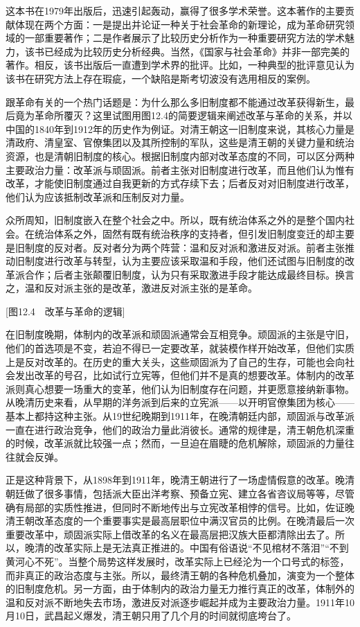 这本书在1979年出版后，迅速引起轰动，赢得了很多学术荣誉。这本著作的主要贡献体现在两个方面：一是提出并论证一种关于社会革命的新理论，成为革命研究领域的一部重要著作；二是作者展示了比较历史分析作为一种重要研究方法的学术魅力，该书已经成为比较历史分析经典。当然，《国家与社会革命》并非一部完美的著作。相反，该书出版后一直遭到学术界的批评。比如，一种典型的批评意见认为该书在研究方法上存在瑕疵，一个缺陷是斯考切波没有选用相反的案例。

跟革命有关的一个热门话题是：为什么那么多旧制度都不能通过改革获得新生，最后竟为革命所覆灭？这里试图用图12.4的简要逻辑来阐述改革与革命的关系，并以中国的1840年到1912年的历史作为例证。对清王朝这一旧制度来说，其核心力量是清政府、清皇室、官僚集团以及其所控制的军队，这些是清王朝的关键力量和统治资源，也是清朝旧制度的核心。根据旧制度内部对改革态度的不同，可以区分两种主要政治力量：改革派与顽固派。前者主张对旧制度进行改革，而且他们认为惟有改革，才能使旧制度通过自我更新的方式存续下去；后者反对对旧制度进行改革，他们认为应该抵制改革派和压制反对力量。

众所周知，旧制度嵌入在整个社会之中。所以，既有统治体系之外的是整个国内社会。在统治体系之外，固然有既有统治秩序的支持者，但引发旧制度变迁的却主要是旧制度的反对者。反对者分为两个阵营：温和反对派和激进反对派。前者主张推动旧制度进行改革与转型，认为主要应该采取温和手段，他们还试图与旧制度的改革派合作；后者主张颠覆旧制度，认为只有采取激进手段才能达成最终目标。换言之，温和反对派主张的是改革，激进反对派主张的是革命。

[图12.4　改革与革命的逻辑]

在旧制度晚期，体制内的改革派和顽固派通常会互相竞争。顽固派的主张是守旧，他们的首选项是不变，若迫不得已一定要改革，就装模作样开始改革，但他们实质上是反对改革的。在历史的重大关头，这些顽固派为了自己的生存，可能也会向社会发出改革的号召，比如试行立宪等，但他们并不是真的想要改革。体制内的改革派则真心想要一场重大的变革，他们认为旧制度存在问题，并更愿意接纳新事物。从晚清历史来看，从早期的洋务派到后来的立宪派——以开明官僚集团为核心——基本上都持这种主张。从19世纪晚期到1911年，在晚清朝廷内部，顽固派与改革派一直在进行政治竞争，他们的政治力量此消彼长。通常的规律是，清王朝危机深重的时候，改革派就比较强一点；然而，一旦迫在眉睫的危机解除，顽固派的力量往往就会反弹。

正是这种背景下，从1898年到1911年，晚清王朝进行了一场虚情假意的改革。晚清朝廷做了很多事情，包括派大臣出洋考察、预备立宪、建立各省咨议局等等，尽管确有局部的实质性推进，但同时不断地传出与立宪改革相悖的信号。比如，佐证晚清王朝改革态度的一个重要事实是最高层职位中满汉官员的比例。在晚清最后一次重要改革中，顽固派实际上借改革的名义在最高层把汉族大臣都清除出去了。所以，晚清的改革实际上是无法真正推进的。中国有俗语说“不见棺材不落泪”“不到黄河心不死”。当整个局势这样发展时，改革实际上已经沦为一个口号式的标签，而非真正的政治态度与主张。所以，最终清王朝的各种危机叠加，演变为一个整体的旧制度危机。另一方面，由于体制内的政治力量无力推行真正的改革，体制外的温和反对派不断地失去市场，激进反对派逐步崛起并成为主要政治力量。1911年10月10日，武昌起义爆发，清王朝只用了几个月的时间就彻底垮台了。

